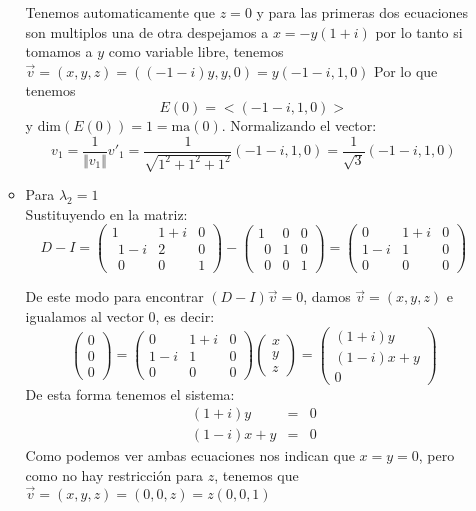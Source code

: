 \begin{itemize}
\begin{itemize}
        Tenemos automaticamente que $z=0$ y para las primeras dos ecuaciones son multiplos una de otra despejamos a $x=-y(1+i)$ por lo tanto si tomamos a $y$ como variable libre, tenemos $\vec{v}=(x,y,z)=((-1-i)y,y,0)=y(-1-i,1,0)$
        Por lo que tenemos
        \[E(0)=<(-1-i,1,0)>\]
        y $\text{dim}(E(0))=1=\text{ma}(0)$. 
        Normalizando el vector:
        \[v_1=\frac{1}{\Vert v_1\Vert}v'_1=\frac{1}{\sqrt{1^2+1^2+1^2}}(-1-i,1,0)=\frac{1}{\sqrt{3}}(-1-i,1,0)\]
        
    
    
    
    \item Para $\lambda_2=1$\\
        Sustituyendo en la matriz:
        \[D-I=\begin{pmatrix}1&1+i&0\\ \:\:1-i&2&0\\ \:\:0&0&1\end{pmatrix}-\begin{pmatrix}1&0&0\\ \:\:0&1&0\\ \:\:0&0&1\end{pmatrix}=\begin{pmatrix}0&1+i&0\\ 1-i&1&0\\ 0&0&0\end{pmatrix}\]
        
        
        De este modo para encontrar $(D-I)\Vec{v}=0$, damos $\vec{v}=(x,y,z)$ e igualamos al vector 0, es decir:
        \[\begin{pmatrix}0\\0\\0\end{pmatrix}=\begin{pmatrix}0&1+i&0\\ 1-i&1&0\\ 0&0&0\end{pmatrix}\begin{pmatrix}x\\y\\z\end{pmatrix}=\begin{pmatrix}(1+i)y\\(1-i)x+y\\ 0\end{pmatrix}\]
        De esta forma tenemos el sistema:
        \begin{eqnarray*}
        (1+i)y&=&0\\
        (1-i)x+y&=&0
        \end{eqnarray*}
        Como podemos ver ambas ecuaciones nos indican que $x=y=0$, pero como no hay restricci\'on para $z$, tenemos que $\vec{v}=(x,y,z)=(0,0,z)=z(0,0,1)$
        

\end{itemize}
\end{itemize}
